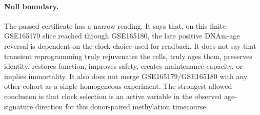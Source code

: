 \paragraph{Null boundary.}
The passed certificate has a narrow reading.  It says that, on this finite GSE165179 slice reached through GSE165180, the late positive DNAm-age reversal is dependent on the clock choice used for readback.  It does not say that transient reprogramming truly rejuvenates the cells, truly ages them, preserves identity, restores function, improves safety, creates maintenance capacity, or implies immortality.  It also does not merge GSE165179/GSE165180 with any other cohort as a single homogeneous experiment.  The strongest allowed conclusion is that clock selection is an active variable in the observed age-signature direction for this donor-paired methylation timecourse.

